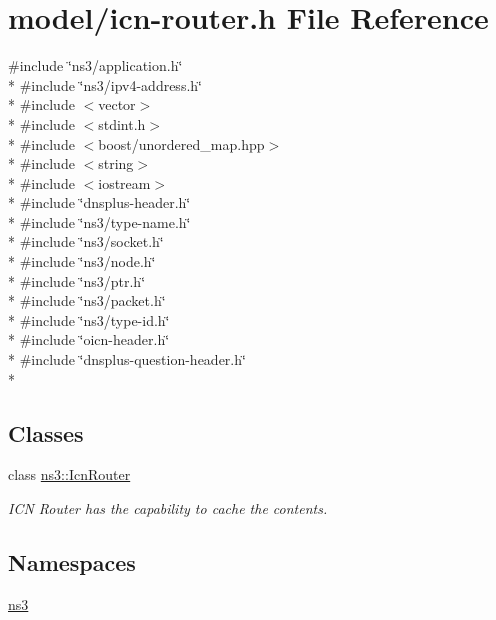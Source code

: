 \hypertarget{icn-router_8h}{\section{model/icn-\/router.h File Reference}
\label{icn-router_8h}
}
{\ttfamily \#include \char`\"{}ns3/application.\-h\char`\"{}}\\*
{\ttfamily \#include \char`\"{}ns3/ipv4-\/address.\-h\char`\"{}}\\*
{\ttfamily \#include $<$vector$>$}\\*
{\ttfamily \#include $<$stdint.\-h$>$}\\*
{\ttfamily \#include $<$boost/unordered\-\_\-map.\-hpp$>$}\\*
{\ttfamily \#include $<$string$>$}\\*
{\ttfamily \#include $<$iostream$>$}\\*
{\ttfamily \#include \char`\"{}dnsplus-\/header.\-h\char`\"{}}\\*
{\ttfamily \#include \char`\"{}ns3/type-\/name.\-h\char`\"{}}\\*
{\ttfamily \#include \char`\"{}ns3/socket.\-h\char`\"{}}\\*
{\ttfamily \#include \char`\"{}ns3/node.\-h\char`\"{}}\\*
{\ttfamily \#include \char`\"{}ns3/ptr.\-h\char`\"{}}\\*
{\ttfamily \#include \char`\"{}ns3/packet.\-h\char`\"{}}\\*
{\ttfamily \#include \char`\"{}ns3/type-\/id.\-h\char`\"{}}\\*
{\ttfamily \#include \char`\"{}oicn-\/header.\-h\char`\"{}}\\*
{\ttfamily \#include \char`\"{}dnsplus-\/question-\/header.\-h\char`\"{}}\\*
\subsection*{Classes}
\begin{DoxyCompactItemize}
\item 
class \hyperlink{classns3_1_1IcnRouter}{ns3\-::\-Icn\-Router}
\begin{DoxyCompactList}\small\item\em I\-C\-N Router has the capability to cache the contents. \end{DoxyCompactList}\end{DoxyCompactItemize}
\subsection*{Namespaces}
\begin{DoxyCompactItemize}
\item 
\hyperlink{namespacens3}{ns3}
\end{DoxyCompactItemize}
